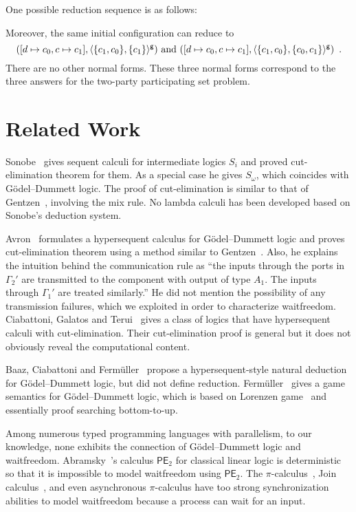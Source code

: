 {One possible reduction sequence is as follows: 

Moreover, the same initial configuration can reduce to
\[
 ({[d\mapsto c_0,c\mapsto c_1]},{\langle{\{c_1,c_0\},
 \{c_1\}}\rangle^{\mathsf{g}}})\text{ and }
 ({[d\mapsto c_0,c\mapsto c_1]},{\langle{\{c_1,c_0\},
 \{c_0, c_1\}}\rangle^{\mathsf{g}}})\enspace.
\]
There are no other normal forms.
These three normal forms correspond to the three answers for the
two-party participating set problem.

\section{Related Work}
\label{related}
Sonobe~\cite{sonobe} gives sequent calculi for intermediate logics $S_i$
and proved cut-elimination theorem for them.  As a special case he gives
$S_\omega$, which coincides with G\"odel--Dummett logic.
The proof of cut-elimination is similar to that of
Gentzen~\cite{gentzen}, involving the mix rule.
No lambda calculi has been developed based on Sonobe's deduction system.

Avron~\cite{avron91} formulates a
hypersequent calculus for G\"odel--Dummett logic and proves
cut-elimination theorem using a method
similar to Gentzen~\cite{gentzen}.
Also, he explains the intuition behind the communication rule as
``the inputs through the ports in $\Gamma_2'$ are transmitted to the
component with output of type $A_1.$  The inputs through $\Gamma_1'$ are
treated similarly.''  He did not mention the possibility of
any transmission failures, which we exploited
in order to characterize waitfreedom.
Ciabattoni, Galatos and Terui~\cite{alg} gives a class of logics
that have
hypersequent calculi with
cut-elimination.
Their cut-elimination proof is general but it does not
obviously reveal the computational content.

Baaz, Ciabattoni and Ferm\"uller~\cite{natural} propose a
hypersequent-style natural deduction for G\"odel--Dummett logic, but
did not define reduction.
Ferm\"uller~\cite{parallel} gives a game semantics for G\"odel--Dummett
logic, which is based on Lorenzen game~\cite{curryhoward} and essentially
proof searching bottom-to-up.

Among numerous typed programming languages with parallelism,
to our knowledge, none exhibits
the connection of G\"odel--Dummett logic and waitfreedom.
Abramsky~\cite{abramsky1993computational}'s calculus $\mathsf{PE}_2$
for classical linear logic is
deterministic
\cite[Theorem~7.9]{abramsky1993computational} so that it is
impossible to model
waitfreedom using $\mathsf{PE}_2$.
The $\pi$-calculus~\cite{milner1999communicating},
Join calculus~\cite{join},
and even asynchronous
$\pi$-calculus \cite{hondatokoro}
have too strong synchronization abilities to model waitfreedom because
a process can wait for an input.

}
